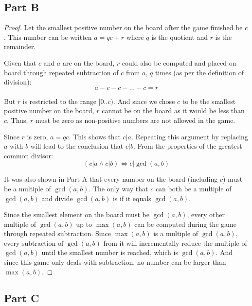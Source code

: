 \documentclass{article}
\begin{document}
\break

\subsection*{Part B}

\begin{proof}

Let the smallest positive number on the board after the game finished be $c$.
This number can be written $a = qc + r$ where $q$ is the quotient and $r$ is the
remainder. 

\bigbreak

Given that $c$ and $a$ are on the board, $r$ could also be computed
and placed on board through repeated subtraction of $c$ from $a$, $q$ times (as
per the definition of division):
$$ a - c - c - \ldots - c = r $$

But $r$ is restricted to the range $[0..c)$. And since we chose $c$ to be the
smallest positive number on the board, $r$ cannot be on the board as it would be
less than $c$. Thus, $r$ must be zero as non-positive numbers are not allowed in
the game.

\bigbreak

Since $r$ is zero, $a = qc$. This shows that $c \vert a$. Repeating this
argument by replacing $a$ with $b$ will lead to the conclusion that $c \vert b$.
From the properties of the greatest common divisor:
$$ (c \vert a \land c \vert b) \iff c \vert \gcd(a, b) $$

It was also shown in Part A that every number on the board (including $c$) must
be a multiple of $\gcd(a, b)$. The only way that $c$ can both be a multiple of
$\gcd(a,b)$ and divide $\gcd(a,b)$ is if it equals $\gcd(a,b)$.

\bigbreak

Since the smallest element on the board must be $\gcd(a, b)$, every other
multiple of $\gcd(a,b)$ up to $\max(a,b)$ can be computed during the game
through repeated subtraction. Since $\max(a,b)$ is a multiple of $\gcd(a,b)$,
every subtraction of $\gcd(a,b)$ from it will incrementally reduce the multiple
of $\gcd(a,b)$ until the smallest number is reached, which is $\gcd(a,b)$. And
since this game only deals with subtraction, no number can be larger than
$\max(a,b)$.

\end{proof}

\break

\subsection*{Part C}
\end{document}
